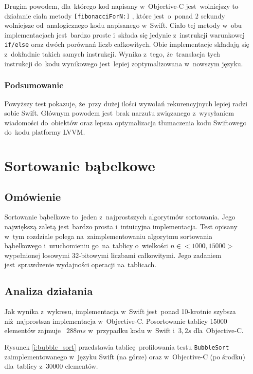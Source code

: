 \documentclass[mgr, shortabstract]{iithesis}
\newcommand{\objcinline}[1]{
    \texttt{#1}
}
\begin{document}
Drugim powodem, dla~którego kod napisany w~Objective-C jest~wolniejszy to działanie ciała metody \objcinline{[fibonacciForN:]}, które jest~o~ponad 2 sekundy wolniejsze od~analogicznego kodu napisanego w~Swift. Ciało tej metody w~obu implementacjach jest~bardzo proste i~składa się jedynie z~instrukcji warunkowej \objcinline{if/else} oraz dwóch porównań liczb całkowitych. Obie implementacje składają się z~dokładnie takich samych instrukcji. Wynika z~tego, że~translacja tych instrukcji do~kodu wynikowego jest~lepiej zoptymalizowana w~nowszym języku.

\subsubsection{Podsumowanie}

Powyższy test pokazuje, że~przy dużej ilości wywołań rekurencyjnych lepiej radzi sobie Swift. Głównym powodem jest~brak narzutu związanego z~wysyłaniem wiadomości do~obiektów oraz lepsza optymalizacja tłumaczenia kodu Swiftowego do~kodu platformy LVVM.

\section{Sortowanie bąbelkowe}
\label{s:bubble_sort}

\subsection{Omówienie}

Sortowanie bąbelkowe to~jeden z~najprostszych algorytmów sortowania. Jego największą zaletą jest~bardzo prosta i~intuicyjna implementacja. Test opisany w~tym rozdziale polega na~zaimplementowaniu algorytmu sortowania bąbelkowego i~uruchomieniu go~na~tablicy o~wielkości $n \in <1000, 15000>$ wypełnionej losowymi 32-bitowymi liczbami całkowitymi. Jego zadaniem jest~sprawdzenie wydajności operacji na~tablicach. 

\subsection{Analiza działania}

Jak wynika z~wykresu, implementacja w~Swift jest~ponad 10-krotnie szybsza niż najprostsza implementacja w~Objective-C. Posortowanie tablicy $15000$ elementów zajmuje ~$288 ms$ w~przypadku kodu w~Swift i~$3,2 s$ dla~Objective-C.

Rysunek \ref{i:bubble_sort} przedstawia tablicę profilowania testu \texttt{BubbleSort} zaimplementowanego w~języku Swift (na górze) oraz w~Objective-C (po środku) dla~tablicy z~30000 elementów.
\end{document}
